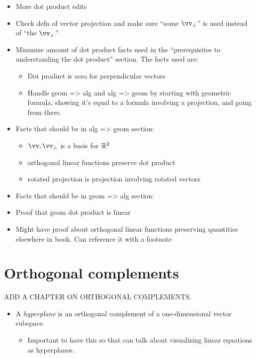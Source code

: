 \begin{itemize}
    \item More dot product edits
    \item Check defn of vector projection and make sure “some $\vv_\perp$” is used instead of “the $\vv_\perp$”
    \item Minimize amount of dot product facts used in the “prerequisites to understanding the dot product” section. The facts used are:
    \begin{itemize}
        \item Dot product is zero for perpendicular vectors
        \item Handle geom => alg and alg => geom by starting with geometric formula, showing it’s equal to a formula involving a projection, and going from there.
    \end{itemize}
    \item Facts that should be in alg => geom section:
    \begin{itemize}
        \item $\vv, \vv_\perp$ is a basis for $\mathbb{R}^2$
        \item orthogonal linear functions preserve dot product
        \item rotated projection is projection involving rotated vectors
    \end{itemize}
    \item Facts that should be in geom => alg section:
    \item Proof that geom dot product is linear
    \item Might have proof about orthogonal linear functions preserving quantities elsewhere in book. Can reference it with a footnote
\end{itemize}

\section*{Orthogonal complements}

ADD A CHAPTER ON ORTHOGONAL COMPLEMENTS.

\begin{itemize}
    \item A \textit{hyperplane} is an orthogonal complement of a one-dimensional vector subspace.
    \begin{itemize}
        \item Important to have this so that can talk about visualizing linear equations as hyperplanes.
    \end{itemize}
\end{itemize}

